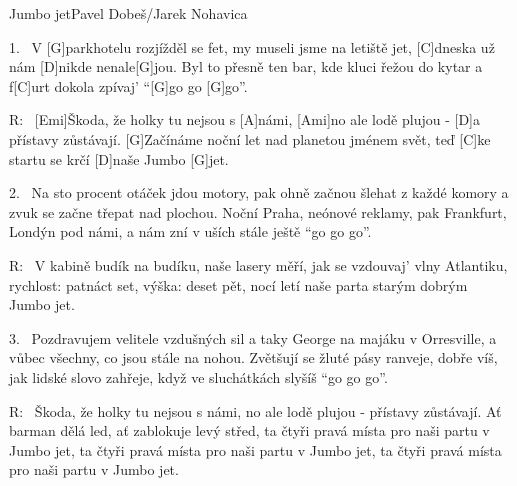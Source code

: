 \begin{song}{Jumbo jet}{Pavel Dobeš/Jarek Nohavica}

\begin{xverse}{1.~}
V [G]parkhotelu rozjížděl se fet,
my museli jsme na letiště jet,
[C]dneska už nám [D]nikde nenale[G]jou.
Byl to přesně ten bar,
kde kluci řežou do kytar
a f[C]urt dokola zpívaj' ``[G]go go [G]go''.
\end{xverse}

\begin{xverse}{R:~}
[Emi]{Ško}da, že holky tu nejsou s [A]námi,
[Ami]no ale lodě plujou - [D]a přístavy zůstávají.
[G]Začínáme noční let nad planetou jménem svět,
teď [C]ke startu se krčí [D]naše Jumbo [G]jet.
\end{xverse}

\begin{xverse}{2.~}
Na sto procent otáček jdou motory,
pak ohně začnou šlehat z každé komory
a zvuk se začne třepat nad plochou.
Noční Praha, neónové reklamy, pak Frankfurt, Londýn pod námi,
a nám zní v uších stále ještě ``go go go''.
\end{xverse}

\begin{xverse}{R:~}
V kabině budík na budíku,
naše lasery měří, jak se vzdouvaj' vlny Atlantiku,
rychlost: patnáct set, výška: deset pět,
   nocí letí naše parta starým dobrým Jumbo jet.
\end{xverse}

\begin{xverse}{3.~}
Pozdravujem velitele vzdušných sil
a taky George na majáku v Orresville,
a vůbec všechny, co jsou stále na nohou.
Zvětšují se žluté pásy ranveje,
dobře víš, jak lidské slovo zahřeje,
když ve sluchátkách slyšíš ``go go go''.
\end{xverse}

\begin{xverse}{R:~}
Škoda, že holky tu nejsou s námi,
no ale lodě plujou - přístavy zůstávají.
Ať barman dělá led, ať zablokuje levý střed,
ta čtyři pravá místa pro naši partu v Jumbo jet,
ta čtyři pravá místa pro naši partu v Jumbo jet,
ta čtyři pravá místa pro naši partu v Jumbo jet.
\end{xverse}

\end{song}




